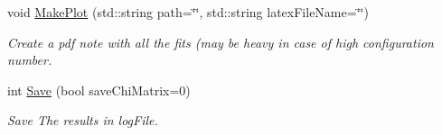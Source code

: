 \begin{DoxyCompactItemize}
void \hyperlink{classTemplateMethod_1_1Template_ac4d93029370867f1fa447092d68513df}{Make\+Plot} (std\+::string path=\char`\"{}\char`\"{}, std\+::string latex\+File\+Name=\char`\"{}\char`\"{})
\begin{DoxyCompactList}\small\item\em Create a pdf note with all the fits (may be heavy in case of high configuration number. \end{DoxyCompactList}\item 
int \hyperlink{classTemplateMethod_1_1Template_a3f23b7913849080f1b47725985f63c76}{Save} (bool save\+Chi\+Matrix=0)
\begin{DoxyCompactList}\small\item\em Save The results in log\+File. \end{DoxyCompactList}\end{DoxyCompactItemize}
